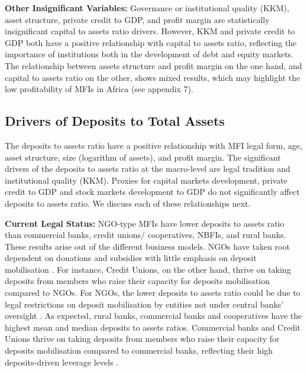 \documentclass[a4paper,nobind]{templates/ociamthesis}
\begin{document}
\textbf{Other Insignificant Variables:} Governance or institutional quality (KKM), asset structure, private credit to GDP, and profit margin are statistically insignificant capital to assets ratio drivers. However, KKM and private credit to GDP both have a positive relationship with capital to assets ratio, reflecting the importance of institutions both in the development of debt and equity markets. The relationship between assets structure and profit margin on the one hand, and capital to assets ratio on the other, shows mixed results, which may highlight the low profitability of MFIs in Africa (see appendix 7).

\hypertarget{drivers-of-deposits-to-total-assets}{%
\subsection{Drivers of Deposits to Total Assets}\label{drivers-of-deposits-to-total-assets}}

The deposits to assets ratio have a positive relationship with MFI legal form, age, asset structure, size (logarithm of assets), and profit margin. The significant drivers of the deposits to assets ratio at the macro-level are legal tradition and institutional quality (KKM). Proxies for capital markets development, private credit to GDP and stock markets development to GDP do not significantly affect deposits to assets ratio. We discuss each of these relationships next.

\textbf{Current Legal Status:} NGO-type MFIs have lower deposits to assets ratio than commercial banks, credit unions/ cooperatives, NBFIs, and rural banks. These results arise out of the different business models. NGOs have taken root dependent on donations and subsidies with little emphasis on deposit mobilisation \autocite{d2013unsubsidized,d2017ngos}. For instance, Credit Unions, on the other hand, thrive on taking deposits from members who raise their capacity for deposits mobilisation compared to NGOs. For NGOs, the lower deposits to assets ratio could be due to legal restrictions on deposit mobilisation by entities not under central banks' oversight \autocite{lauer2008transforming}. As expected, rural banks, commercial banks and cooperatives have the highest mean and median deposits to assets ratios. Commercial banks and Credit Unions thrive on taking deposits from members who raise their capacity for deposits mobilisation compared to commercial banks, reflecting their high deposits-driven leverage levels \autocite{abbas2020commercial}.
\end{document}
